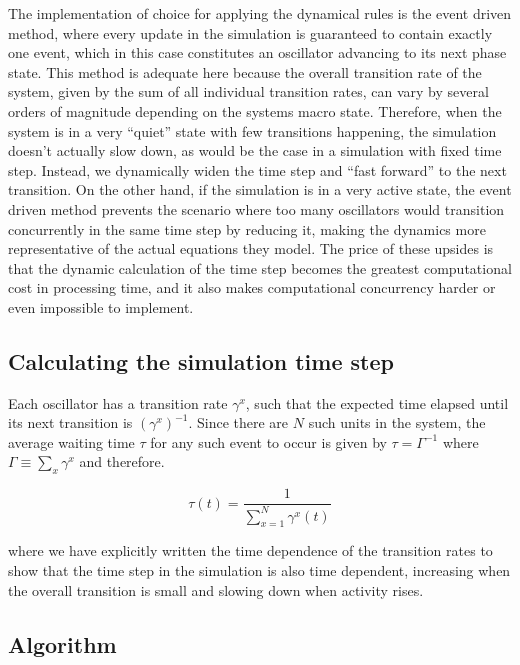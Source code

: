 The implementation of choice for applying the dynamical rules is the event driven method, where every update in the simulation is
guaranteed to contain exactly one event, which in this case constitutes an oscillator advancing to its next phase state. This method is
adequate here because the overall transition rate of the system, given by the sum of all individual transition rates, can vary by
several orders of magnitude depending on the systems macro state. Therefore, when the system is in a very ``quiet'' state with few
transitions happening, the simulation doesn't actually slow down, as would be the case in a simulation with fixed time step. Instead,
we dynamically widen the time step and ``fast forward'' to the next transition. On the other hand, if the simulation is in a very
active state, the event driven method prevents the scenario where too many oscillators would transition concurrently in the same time
step by reducing it, making the dynamics more representative of the actual equations they model. The price of these upsides is that the
dynamic calculation of the time step becomes the greatest computational cost in processing time, and it also makes computational
concurrency harder or even impossible to implement.

\subsection*{Calculating the simulation time step}

Each oscillator has a transition rate $\gamma^x$, such that the expected time elapsed until its next transition is $(\gamma^x)^{-1}$.
Since there are $N$ such units in the system, the average waiting time $\tau$ for any such event to occur is given by $\tau =
\Gamma^{-1}$ where $\Gamma \equiv \sum_x \gamma^x$ and therefore.

\begin{equation}
	\tau(t) = \frac{1}{\sum\limits_{x=1}^N \gamma^x(t)}
\end{equation}

\noindent where we have explicitly written the time dependence of the transition rates to show that the time step in the simulation is
also time dependent, increasing when the overall transition is small and slowing down when activity rises.

\subsection*{Algorithm}

